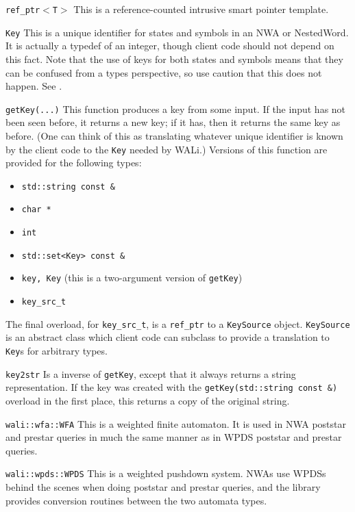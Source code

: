 \begin{description}
  \item\texttt{ref\_ptr$<$T$>$} This is a reference-counted intrusive smart
    pointer template.
  \item\texttt{Key} This is a unique identifier for states and symbols in an
    NWA or NestedWord. It is actually a typedef of an integer, though client
    code should not depend on this fact. Note that the use of keys for both
    states and symbols means that they can be confused from a types
    perspective, so use caution that this does not happen. See \cite{wali}.
  \item\texttt{getKey(...)} This function produces a key from some input. If
    the input has not been seen before, it returns a new key; if it has, then
    it returns the same key as before. (One can think of this as translating
    whatever unique identifier is known by the client code to the
    \texttt{Key} needed by WALi.) Versions of this function are provided for
    the following types:
    \begin{itemize}
      \item \texttt{std::string const \&}
      \item \texttt{char *}
      \item \texttt{int}
      \item \texttt{std::set<Key> const \&}
      \item \texttt{key, Key} (this is a two-argument version of
        \texttt{getKey})
      \item \texttt{key\_src\_t}
    \end{itemize}

    The final overload, for \texttt{key\_src\_t}, is a \texttt{ref\_ptr} to a
    \texttt{KeySource} object. \texttt{KeySource} is an abstract class which
    client code can subclass to provide a translation to \texttt{Key}s for
    arbitrary types.
  \item\texttt{key2str} Is a inverse of \texttt{getKey}, except that it
    always returns a string representation. If the key was created with the
    \texttt{getKey(std::string const \&)} overload in the first place, this
    returns a copy of the original string.
  \item\texttt{wali::wfa::WFA} This is a weighted finite automaton. It is
    used in NWA poststar and prestar queries in much the same manner as in
    WPDS poststar and prestar queries.
  \item\texttt{wali::wpds::WPDS} This is a weighted pushdown system. NWAs use
    WPDSs behind the scenes when doing poststar and prestar queries, and the
    library provides conversion routines between the two automata types.
\end{description}


